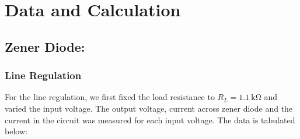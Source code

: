 \documentclass{scrartcl}
\begin{document}
\section{Data and Calculation}
\subsection{Zener Diode:}
\subsubsection{Line Regulation }
For the line regulation, we first fixed the load resistance to $R_L = \SI{1.1}{\kohm}$ and varied the input voltage. The output voltage, current across zener diode and the current in the circuit was measured for each input voltage. The data is tabulated below:
\end{document}
